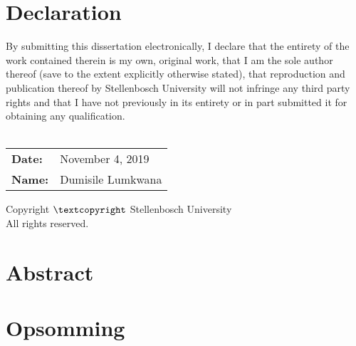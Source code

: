 \TitlePage

\chapter{Declaration}
By submitting this dissertation electronically, I declare that the entirety of the work contained therein is my own, original work, that I am the sole author thereof (save to the extent explicitly otherwise stated), that reproduction and publication thereof by Stellenbosch University will not infringe any third party rights and that I have not previously in its entirety or in part submitted it for obtaining any qualification. \\ \\

\noindent
\begin{tabular}{@{}ll}
\textbf{Date:} & November 4, 2019 \\ 
\textbf{Name:} & Dumisile Lumkwana \\ 
\end{tabular}

\vspace*{\fill}
\begin{center}
Copyright $\textcopyright$ Stellenbosch University \\
All rights reserved.
\end{center}

\chapter{Abstract}
\newpage

\chapter{Opsomming}
\newpage

